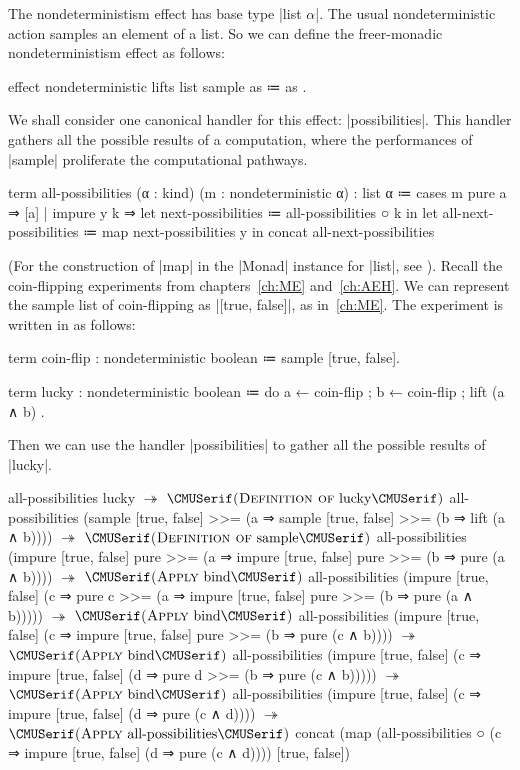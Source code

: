 The nondeterministism effect has base type \code|list $α$|.
The usual nondeterministic action samples an element of a list.
So we can define the freer-monadic nondeterministism effect as follows:
%
\begin{program}
effect nondeterministic
 lifts list
  { sample as ≔ as }.
\end{program}
%
We shall consider one canonical handler for this effect: \code|possibilities|.
This handler gathers all the possible results of a computation, where the performances of \code|sample| proliferate the computational pathways.
%
\begin{program}
term all-possibilities (α : kind) (m : nondeterministic α) : list α
  ≔ cases m
      { pure   a   ⇒ [a]
      | impure y k ⇒
          let next-possibilities     ≔ all-possibilities ○ k in
          let all-next-possibilities ≔ map next-possibilities y in
          concat all-next-possibilities }
\end{program}
%
(For the construction of \code|map| in the \code|Monad| instance for \code|list|, see \prelude\LangA).
Recall the coin-flipping experiments from chapters~\ref{ch:ME} and~\ref{ch:AEH}.
We can represent the sample list of coin-flipping as \code|[true, false]|, as in~\ref{ch:ME}.
The experiment is written in \LangE as follows:
%
\begin{snippet}
term coin-flip : nondeterministic boolean
  ≔ sample [true, false].

term lucky : nondeterministic boolean
  ≔ do
      { a ← coin-flip
      ; b ← coin-flip
      ; lift (a ∧ b) }.
\end{snippet}
Then we can use the handler \code|possibilities| to gather all the possible results of \code|lucky|.
\newpage
\begin{snippet}
all-possibilities lucky
$↠$ $\ruleappwith{Definition of}{lucky}$
all-possibilities
  (sample [true, false] >>= (a ⇒
    sample [true, false] >>= (b ⇒
      lift (a ∧ b))))
$↠$ $\ruleappwith{Definition of}{sample}$
all-possibilities
  (impure [true, false] pure >>= (a ⇒
    impure [true, false] pure >>= (b ⇒
      pure (a ∧ b))))
$↠$ $\ruleappwith{Apply}{bind}$
all-possibilities
  (impure [true, false] (c ⇒
    pure c >>= (a ⇒
      impure [true, false] pure >>= (b ⇒
        pure (a ∧ b)))))
$↠$ $\ruleappwith{Apply}{bind}$
all-possibilities
  (impure [true, false] (c ⇒
    impure [true, false] pure >>= (b ⇒
      pure (c ∧ b))))
$↠$ $\ruleappwith{Apply}{bind}$
all-possibilities
  (impure [true, false] (c ⇒
    impure [true, false] (d ⇒
      pure d >>= (b ⇒
        pure (c ∧ b)))))
$↠$ $\ruleappwith{Apply}{bind}$
all-possibilities
  (impure [true, false] (c ⇒
    impure [true, false] (d ⇒
      pure (c ∧ d))))
$↠$ $\ruleappwith{Apply}{all-possibilities}$
concat
  (map (all-possibilities ○ (c ⇒
          impure [true, false] (d ⇒
            pure (c ∧ d))))
    [true, false])
\end{snippet}

